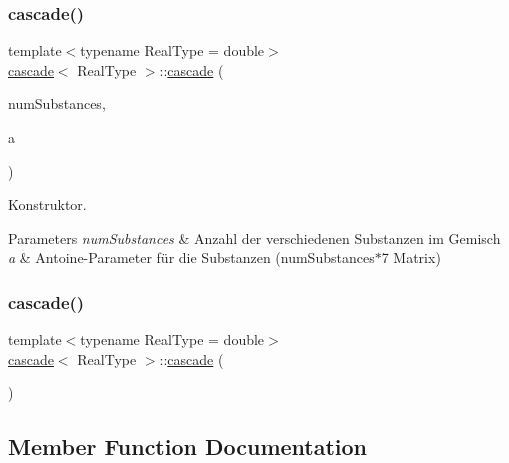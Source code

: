 \subsubsection{\texorpdfstring{cascade()}{cascade()}\hspace{0.1cm}{\footnotesize\ttfamily [1/2]}}
{\footnotesize\ttfamily template$<$typename Real\+Type = double$>$ \\
\mbox{\hyperlink{classcascade}{cascade}}$<$ Real\+Type $>$\+::\mbox{\hyperlink{classcascade}{cascade}} (\begin{DoxyParamCaption}\item[{int}]{num\+Substances,  }\item[{Matrix$<$ Real\+Type, Dynamic, 7 $>$}]{a }\end{DoxyParamCaption})\hspace{0.3cm}{\ttfamily [inline]}}



Konstruktor. 


\begin{DoxyParams}{Parameters}
{\em num\+Substances} & Anzahl der verschiedenen Substanzen im Gemisch \\
\hline
{\em a} & Antoine-\/\+Parameter für die Substanzen (num\+Substances$\ast$7 Matrix) \\
\hline
\end{DoxyParams}
\mbox{\label{classcascade_a368b15328ebb48ae4af81dacd2d3165f}} 
\subsubsection{\texorpdfstring{cascade()}{cascade()}\hspace{0.1cm}{\footnotesize\ttfamily [2/2]}}
{\footnotesize\ttfamily template$<$typename Real\+Type = double$>$ \\
\mbox{\hyperlink{classcascade}{cascade}}$<$ Real\+Type $>$\+::\mbox{\hyperlink{classcascade}{cascade}} (\begin{DoxyParamCaption}{ }\end{DoxyParamCaption})\hspace{0.3cm}{\ttfamily [inline]}}



\subsection{Member Function Documentation}
\mbox{\label{classcascade_a04cb46ee066fb830e25828fc28cec392}} 
